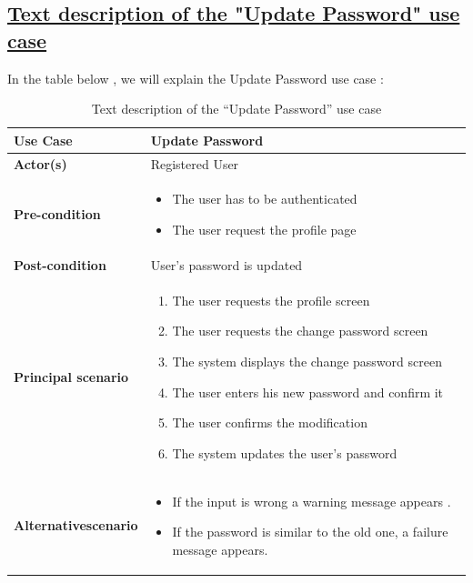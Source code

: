 \newpage
\subsection*{\textbf{\underline{Text description of the "Update Password" use case}}}

\vspace{0.25cm}
In the table below , we will explain the Update Password use case : 

\begin{table}[H]
    \renewcommand{\arraystretch}{1.5}
    
   \begin{tabular}{|p{}|p{}|}
   \hline
     
        \textbf{Use Case} &Update Password  \\   \hline
        
        \textbf{Actor(s) } & Registered User  \\   \hline
        \textbf{Pre-condition} &  
        \begin{itemize}[left=0pt]
             \renewcommand\labelitemi{\textbf{\Huge .}}
            \item The user has to be authenticated 
            \item The user request the profile page 
        \end{itemize} \\   \hline


        \textbf{Post-condition} & User's password is updated \\  \hline

                \textbf{Principal scenario} & 
                \begin{enumerate}[left=0pt]
                \item The user requests the profile screen
                \item The user requests the change password screen
                \item The system displays the change password screen
                \item The user enters his new password and confirm it 
                \item The user confirms the modification
                \item The system updates the user's password
                \end{enumerate}  \\   \hline
                 
          \textbf{Alternative\newline scenario} & 
        \begin{itemize}[left=0pt]
             \renewcommand\labelitemi{\textbf{\Huge .}}
            \item If the input is wrong a warning message appears .
            \item If the password is similar to the old one, a failure message appears.
        \end{itemize} \\   \hline
\end{tabular}
         \caption{Text description of the “Update Password” use case}
    \label{tab:my_label}
\end{table}
